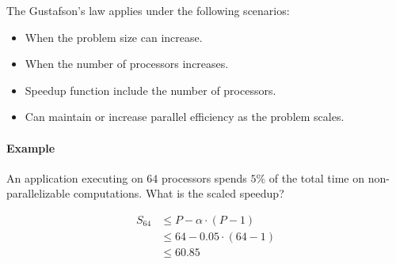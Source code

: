 The Gustafson’s law applies under the following scenarios:
\begin{itemize}
    \item When the problem size can increase.
    \item When the number of processors increases.
    \item Speedup function include the number of processors.
    \item Can maintain or increase parallel efficiency as the problem scales.
\end{itemize}

\paragraph{Example} An application executing on $64$ processors spends $5\%$ of the total time on non-parallelizable computations.
What is the scaled speedup?

\begin{equation}
    \begin{split}
        S_64 & \le P - \alpha \cdot (P-1)\\
        & \le 64 - 0.05 \cdot (64 - 1)\\
        & \le 60.85
    \end{split}
\end{equation}